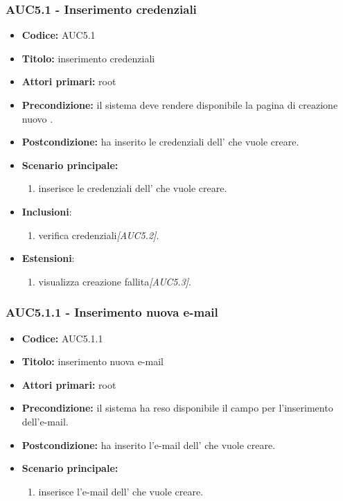 \documentclass[casi-duso]{subfiles}
\begin{document}
\subsubsection{AUC5.1 - Inserimento credenziali}%
\label{subsub:AUC5.1}
\begin{itemize}
  \item \textbf{Codice:} AUC5.1
  \item \textbf{Titolo:} inserimento credenziali
  \item \textbf{Attori primari:} root
  \item \textbf{Precondizione:} il sistema deve rendere disponibile la pagina di creazione nuovo .
  \item \textbf{Postcondizione:}  ha inserito le credenziali dell' che vuole creare.
  \item \textbf{Scenario principale:}
  \begin{enumerate}
    \item {} inserisce le credenziali dell' che vuole creare.
  \end{enumerate}
  \item \textbf{Inclusioni}:
  \begin{enumerate}
    \item verifica credenziali\emph{[AUC5.2]}.
  \end{enumerate}
  \item \textbf{Estensioni}:
  \begin{enumerate}
    \item  visualizza creazione fallita\emph{[AUC5.3]}.
  \end{enumerate}
\end{itemize}

\subsubsection{AUC5.1.1 - Inserimento nuova e-mail}%
\label{subsub:AUC5.1.1}
\begin{itemize}
  \item \textbf{Codice:} AUC5.1.1
  \item \textbf{Titolo:} inserimento nuova e-mail
  \item \textbf{Attori primari:} root
  \item \textbf{Precondizione:} il sistema ha reso disponibile il campo per l'inserimento dell'e-mail.
  \item \textbf{Postcondizione:}  ha inserito l'e-mail dell' che vuole creare.
  \item \textbf{Scenario principale:}
  \begin{enumerate}
    \item {} inserisce l'e-mail dell' che vuole creare.
  \end{enumerate}
\end{itemize}
\end{document}
